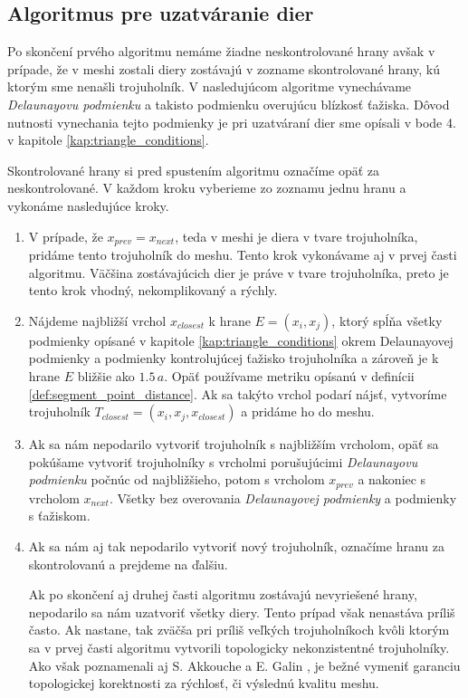 \subsection{Algoritmus pre uzatváranie dier}

Po skončení prvého algoritmu nemáme žiadne neskontrolované hrany avšak v prípade, že v meshi zostali 
diery zostávajú v zozname skontrolované hrany, kú ktorým sme nenašli trojuholník. V nasledujúcom 
algoritme vynechávame \textit{Delaunayovu podmienku} a takisto podmienku overujúcu blízkosť ťažiska. 
Dôvod nutnosti vynechania tejto podmienky je pri uzatváraní dier sme opísali v bode 4. v kapitole 
\ref{kap:triangle_conditions}.

Skontrolované hrany si pred spustením algoritmu označíme opäť za neskontrolované. V každom kroku vyberieme
zo zoznamu jednu hranu a vykonáme nasledujúce kroky.
\begin{enumerate}
    \item{
        V prípade, že $x_{prev} = x_{next}$, teda v meshi je diera v tvare trojuholníka, pridáme tento 
        trojuholník do meshu. Tento krok vykonávame aj v prvej časti algoritmu. Väčšina zostávajúcich
        dier je práve v tvare trojuholníka, preto je tento krok vhodný, nekomplikovaný a rýchly.
    }
    \item{
        Nájdeme najbližší vrchol $x_{closest}$ k hrane $E = (x_i, x_j)$, ktorý spĺňa všetky podmienky 
        opísané v kapitole \ref{kap:triangle_conditions} okrem Delaunayovej podmienky a podmienky 
        kontrolujúcej ťažisko trojuholníka a zároveň je k hrane $E$ bližšie ako $1.5 \, a$. 
        Opäť používame metriku 
        opísanú v definícii \ref{def:segment_point_distance}. Ak sa takýto vrchol podarí nájsť, 
        vytvoríme trojuholník $T_{closest} = (x_i, x_j, x_{closest})$ a pridáme ho do meshu.
    }
    \item{
        Ak sa nám nepodarilo vytvoriť trojuholník s najbližším vrcholom, opäť sa pokúšame vytvoriť 
        trojuholníky s vrcholmi porušujúcimi \textit{Delaunayovu podmienku} počnúc od najbližšieho, 
        potom s vrcholom $x_{prev}$
        a nakoniec s vrcholom $x_{next}$. Všetky bez overovania \textit{Delaunayovej podmienky} a 
        podmienky s ťažiskom.
    }
    \item{
        Ak sa nám aj tak nepodarilo vytvoriť nový trojuholník, označíme hranu za skontrolovanú a prejdeme
        na ďalšiu.
    }
    
    Ak po skončení aj druhej časti algoritmu zostávajú nevyriešené hrany, nepodarilo sa nám 
    uzatvoriť všetky diery. Tento prípad však nenastáva príliš často. Ak nastane, tak zväčša pri 
    príliš veľkých trojuholníkoch kvôli ktorým sa v prvej časti algoritmu vytvorili topologicky
    nekonzistentné trojuholníky. Ako však poznamenali aj S. Akkouche a E. Galin 
    \cite{akkouche2001adaptive}, je bežné vymeniť garanciu topologickej korektnosti za rýchlosť,
    či výslednú kvalitu meshu. 
\end{enumerate}

